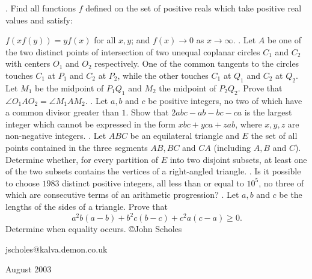 \nopagenumbers
{}
\vskip 25pt
. Find all functions $f$ defined on the set of positive reals which take positive real values and satisfy: 

$f(xf(y))=yf(x)$ for all $x,y$; and $f(x)\to0$ as $x\to\infty$.
\vskip 12pt
. Let $A$ be one of the two distinct points of intersection of two unequal coplanar circles $C_1$ and $C_2$ with centers $O_1$ and $O_2$ respectively. One of the common tangents to the circles touches $C_1$ at $P_1$ and $C_2$ at $P_2$, while the other touches $C_1$ at $Q_1$ and $C_2$ at $Q_2$. Let $M_1$ be the midpoint of $P_1Q_1$ and $M_2$ the midpoint of $P_2Q_2$. Prove that $\angle O_1AO_2=\angle M_1AM_2$.
\vskip 12pt
. Let $a,b$ and $c$ be positive integers, no two of which have a common divisor greater than $1$. Show that $2abc-ab-bc-ca$ is the largest integer which cannot be expressed in the form $xbc+yca+zab$, where $x,y,z$ are non-negative integers.
\vskip 12pt
. Let $ABC$ be an equilateral triangle and $E$ the set of all points contained in the three segments $AB,BC$ and $CA$ (including $A,B$ and $C$). Determine whether, for every partition of $E$ into two disjoint subsets, at least one of the two subsets contains the vertices of a right-angled triangle.
\vskip 12pt
. Is it possible to choose $1983$ distinct positive integers, all less than or equal to $10^5$, no three of which are consecutive terms of an arithmetic progression?
\vskip 12pt
. Let $a,b$ and $c$ be the lengths of the sides of a triangle. Prove that $$a^2b(a-b)+b^2c(b-c)+c^2a(c-a)\ge0.$$ Determine when equality occurs.
\vskip 20pt
\noindent \copyright John Scholes

\noindent jscholes@kalva.demon.co.uk

 August 2003

\bye
